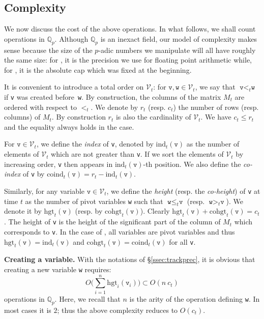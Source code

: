 \documentclass[sigconf]{acmart}
\newcommand{\Q}{\mathbb Q}
\newcommand{\Qp}{\Q_p}
\newcommand{\calV}{\mathcal{V}}
\newcommand{\ttv}{\texttt{v}\xspace}
\newcommand{\ttw}{\texttt{w}\xspace}
\newcommand{\ZpLC}{\text{\color{output} \rm \tt ZpLC}\xspace}
\newcommand{\ZpLF}{\text{\color{output} \rm \tt ZpLF}\xspace}
\newcommand{\ind}{\text{ind}}
\newcommand{\coind}{\text{coind}}
\newcommand{\hgt}{\text{hgt}}
\newcommand{\cohgt}{\text{cohgt}}
\theoremstyle{definition}
\begin{document}
\subsection{Complexity}
\label{ssec:complexity}

We now discuss the cost of the above operations.
In what follows, we shall count operations in $\Qp$. Although $\Qp$
is an inexact field, our model of complexity makes sense because the
size of the $p$-adic numbers we manipulate will all have roughly the
same size: for \ZpLF, it is the precision we use for floating point 
arithmetic while, for \ZpLC, it is the absolute cap which
was fixed at the beginning.

It is convenient to introduce a total order on $\calV_t$: for $\ttv, 
\ttw \in \calV_t$, we say that $\ttv <_t \ttw$ if \ttv was created 
before~\ttw. By construction, the columns of the matrix $M_t$ are 
ordered with respect to $<_t$. We denote by $r_t$ (resp. $c_t$) the
number of rows (resp. columns) of $M_t$. By construction $r_t$ is
also the cardinality of $\calV_t$. We have $c_t \leq r_t$ and the 
equality always holds in the \ZpLC case.

For $\ttv \in \calV_t$, we define the \emph{index} of \ttv, denoted by 
$\ind_t(\ttv)$ as the number of elements of $\calV_t$ which are not 
greater than \ttv. If we sort the elements of $\calV_t$ by increasing 
order, \ttv then appears in $\ind_t(\ttv)$-th position.
We also define the \emph{co-index} of \ttv by
$\coind_t(\ttv) = r_t - \ind_t(\ttv)$.

Similarly, for any variable $\ttv \in \calV_t$, we define the 
\emph{height} (resp. the \emph{co-height}) of \ttv at time $t$ as the 
number of pivot variables \ttw such that $\ttw \leq_t \ttv$ (resp. 
$\ttw >_t \ttv$). We denote it by $\hgt_t(\ttv)$ (resp. by 
$\cohgt_t(\ttv)$). Clearly $\hgt_t(\ttv) + \cohgt_t(\ttv) = c_t$.
The height of \ttv is the height of the significant 
part of the column of $M_t$ which corresponds to \ttv. In the case of
\ZpLC, all variables are pivot variables and thus $\hgt_t(\ttv) = 
\ind_t(\ttv)$ and $\cohgt_t(\ttv) = \coind_t(\ttv)$ for all \ttv.

\medskip

\noindent \textbf{Creating a variable.}
%
With the notations of \S \ref{ssec:trackprec}, it is obvious that 
creating a new variable \ttw requires:
$$O\bigg(\sum_{i=1}^n \hgt_i(\ttv_i)\bigg) \subset O(n \: c_t)$$ 
operations in $\Qp$. Here, we recall that $n$ is the arity of the 
operation defining \ttw. In most cases it is $2$; thus the above
complexity reduces to $O(c_t)$.
\end{document}
